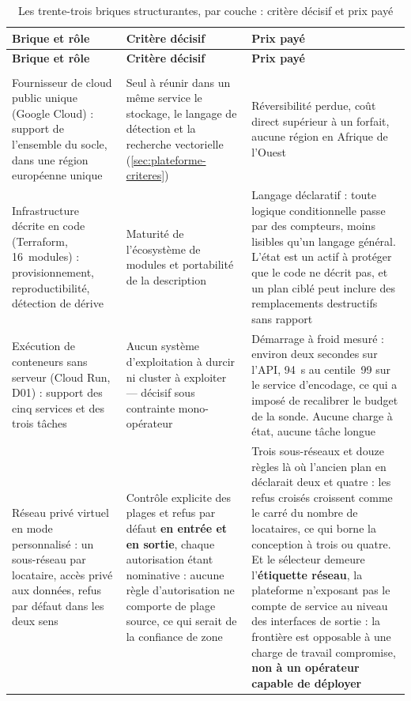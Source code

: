 \begingroup
\setlength{\tabcolsep}{2pt}
\renewcommand{\arraystretch}{0.92}
\setlength{\LTpre}{2pt}
\setlength{\LTpost}{2pt}
\begin{longtable}{|P{3.50cm}|P{5.10cm}|P{6.90cm}|}
\caption{Les trente-trois briques structurantes, par couche : critère décisif et prix payé}
\label{tab:briques-structurantes}\\
\hline
\textbf{Brique et rôle} & \textbf{Critère décisif} & \textbf{Prix payé} \\
\hline
\endfirsthead
\hline
\textbf{Brique et rôle} & \textbf{Critère décisif} & \textbf{Prix payé} \\
\hline
\endhead
\hline
\endfoot
{} \\ \hline
Fournisseur de cloud public unique (Google Cloud) : support de l'ensemble du socle, dans une
région européenne unique &
Seul à réunir dans un même service le stockage, le langage de détection et la recherche
vectorielle (\cref{sec:plateforme-criteres}) &
Réversibilité perdue, coût direct supérieur à un forfait, aucune région en Afrique de
l'Ouest \\ \hline

Infrastructure décrite en code (Terraform, 16~modules) : provisionnement, reproductibilité,
détection de dérive &
Maturité de l'écosystème de modules et portabilité de la description &
Langage déclaratif : toute logique conditionnelle passe par des compteurs, moins lisibles qu'un
langage général. L'état est un actif à protéger que le code ne décrit pas, et un plan ciblé peut
inclure des remplacements destructifs sans rapport \\ \hline

Exécution de conteneurs sans serveur (Cloud Run, D01) : support des cinq services et des trois
tâches &
Aucun système d'exploitation à durcir ni cluster à exploiter --- décisif sous contrainte
mono-opérateur &
Démarrage à froid mesuré : environ deux secondes sur l'API, 94~s au centile~99 sur le service
d'encodage, ce qui a imposé de recalibrer le budget de la sonde. Aucune charge à état, aucune
tâche longue \\ \hline

Réseau privé virtuel en mode personnalisé : un sous-réseau par locataire, accès privé aux
données, refus par défaut dans les deux sens &
Contrôle explicite des plages et refus par défaut \textbf{en entrée et en sortie}, chaque
autorisation étant nominative : aucune règle d'autorisation ne comporte de plage source, ce qui
serait de la confiance de zone &
Trois sous-réseaux et douze règles là où l'ancien plan en déclarait deux et quatre : les refus
croisés croissent comme le carré du nombre de locataires, ce qui borne la conception à trois ou
quatre. Et le sélecteur demeure l'\textbf{étiquette réseau}, la plateforme n'exposant pas le
compte de service au niveau des interfaces de sortie : la frontière est opposable à une charge de
travail compromise, \textbf{non à un opérateur capable de déployer} \\ \hline


\end{longtable}
